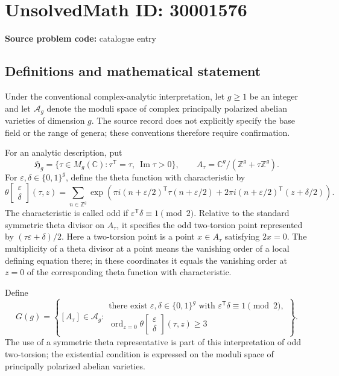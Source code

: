 \documentclass[11pt]{article}
\newcommand{\Z}{\mathbb{Z}}
\newcommand{\C}{\mathbb{C}}
\begin{document}
\section*{UnsolvedMath ID: 30001576}
\textbf{Source problem code:} catalogue entry
\subsection{Definitions and mathematical statement}
Under the conventional complex-analytic interpretation, let \(g\geq 1\) be an integer and let \(\mathcal A_g\) denote the moduli space of complex principally polarized abelian varieties of dimension \(g\). The source record does not explicitly specify the base field or the range of genera; these conventions therefore require confirmation.

For an analytic description, put
\[
\mathfrak H_g=\{\tau\in M_g(\C):\tau^{\mathsf T}=\tau,\ \operatorname{Im}\tau>0\},
\qquad
A_\tau=\C^g/(\Z^g+\tau\Z^g).
\]
For \(\varepsilon,\delta\in\{0,1\}^g\), define the theta function with characteristic by
\[
\theta\!\begin{bmatrix}\varepsilon\\\delta\end{bmatrix}(\tau,z)
=
\sum_{n\in\Z^g}
\exp\!\left(
\pi i(n+\varepsilon/2)^{\mathsf T}\tau(n+\varepsilon/2)
+2\pi i(n+\varepsilon/2)^{\mathsf T}(z+\delta/2)
\right).
\]
The characteristic is called odd if \(\varepsilon^{\mathsf T}\delta\equiv1\pmod 2\). Relative to the standard symmetric theta divisor on \(A_\tau\), it specifies the odd two-torsion point represented by \((\tau\varepsilon+\delta)/2\). Here a two-torsion point is a point \(x\in A_\tau\) satisfying \(2x=0\). The multiplicity of a theta divisor at a point means the vanishing order of a local defining equation there; in these coordinates it equals the vanishing order at \(z=0\) of the corresponding theta function with characteristic.

Define
\[
G(g)=\left\{
[A_\tau]\in\mathcal A_g:
\begin{array}{l}
\text{there exist }\varepsilon,\delta\in\{0,1\}^g
\text{ with }\varepsilon^{\mathsf T}\delta\equiv1\pmod2,\\
\operatorname{ord}_{z=0}
\theta\!\begin{bmatrix}\varepsilon\\\delta\end{bmatrix}(\tau,z)\geq3
\end{array}
\right\}.
\]
The use of a symmetric theta representative is part of this interpretation of odd two-torsion; the existential condition is expressed on the moduli space of principally polarized abelian varieties.
\end{document}
